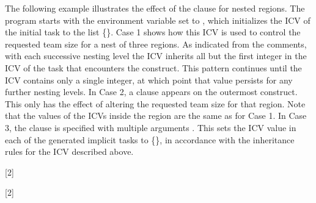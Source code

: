 The following example illustrates the effect of the  clause
for nested  regions. The program starts with the environment
variable  set to , which initializes the
 ICV of the initial task to the list \{\}. Case 1 shows 
how this ICV is used to control the requested team size for a nest of three 
 regions. As indicated from the comments, with each
successive nesting level the  ICV inherits all but the first
integer in the  ICV of the task that encounters the
 construct. This pattern continues until the 
ICV contains only a single integer, at which point that value persists for any
further nesting levels. In Case 2, a  clause appears on
the outermost  construct. This only has the effect of altering
the requested team size for that  region. Note that the values of
the  ICVs inside the  region are the same as
for Case 1. In Case 3, the  clause is specified with
multiple arguments . This sets the  ICV value in each of
the generated implicit tasks to \{\}, in accordance with the inheritance rules 
for the  ICV described above.

[2]

[2]

